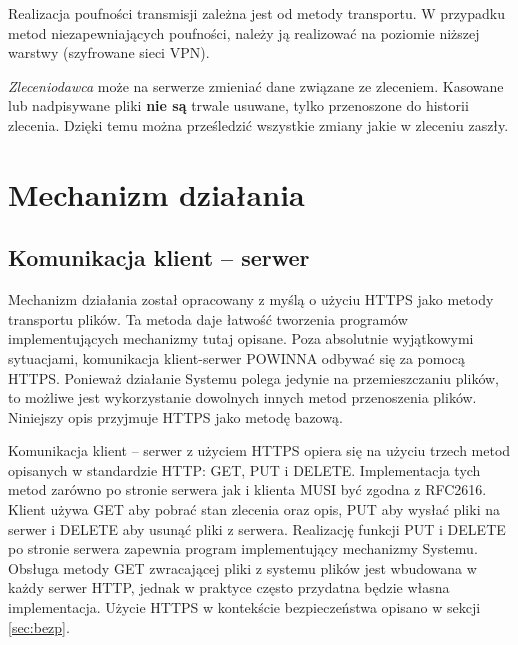 \documentclass[a4paper]{article}
\begin{document}
Realizacja poufności transmisji zależna jest od metody transportu. W przypadku
metod niezapewniających poufności, należy ją realizować na poziomie niższej
warstwy (szyfrowane sieci VPN).

\emph{Zleceniodawca} może na serwerze zmieniać dane związane ze zleceniem. Kasowane
lub nadpisywane pliki \textbf{nie są} trwale usuwane, tylko przenoszone do historii
zlecenia. Dzięki temu można prześledzić wszystkie zmiany jakie w zleceniu
zaszły.

\section{Mechanizm działania}

\subsection{Komunikacja klient -- serwer}

Mechanizm działania został opracowany z myślą o użyciu HTTPS jako metody transportu plików.
Ta metoda daje łatwość tworzenia programów implementujących mechanizmy tutaj opisane. Poza
absolutnie wyjątkowymi sytuacjami, komunikacja klient-serwer POWINNA odbywać się za pomocą
HTTPS. Ponieważ działanie Systemu polega jedynie na przemieszczaniu plików, to możliwe jest
wykorzystanie dowolnych innych metod przenoszenia plików. Niniejszy opis przyjmuje
HTTPS jako metodę bazową.

Komunikacja klient -- serwer z użyciem HTTPS opiera się na użyciu trzech metod opisanych w
standardzie HTTP: GET, PUT i DELETE. Implementacja tych metod zarówno po stronie serwera
jak i klienta MUSI być zgodna z RFC2616. Klient używa GET aby pobrać stan zlecenia oraz
opis, PUT aby wysłać pliki na serwer i DELETE aby usunąć pliki z serwera. Realizację
funkcji PUT i DELETE po stronie serwera zapewnia program implementujący mechanizmy Systemu.
Obsługa metody GET zwracającej pliki z systemu plików jest wbudowana w każdy serwer
HTTP, jednak w praktyce często przydatna będzie własna implementacja. Użycie HTTPS w
kontekście bezpieczeństwa opisano w sekcji \ref{sec:bezp}.
\end{document}
